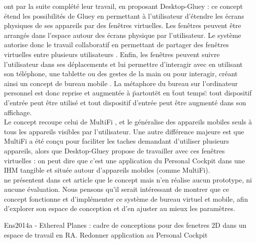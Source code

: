 
\cite{Serrano2015a} ont par la suite complété leur travail, en proposant Desktop-Gluey : ce concept étend les possibilités de Gluey en permettant à l'utilisateur d'étendre les écrans physiques de ses appareils par des fenêtres virtuelles. Les fenêtres peuvent être arrangés dans l'espace autour des écrans physique par l'utilisateur. Le système autorise donc le travail collaboratif en permettant de partager des fenêtres virtuelles entre plusieurs utilisateurs . Enfin, les fenêtres peuvent suivre l'utilisateur dans ses déplacements et lui permettre d'interagir avec en utilisant son téléphone, une tablette ou des gestes de la main ou pour interagir, créant ainsi un concept de bureau mobile . La métaphore du bureau sur l'ordinateur personnel est donc reprise et augmentée à \"partout\" et en \"tout temps\" : tout dispositif d'entrée peut être utilisé et tout dispositif d'entrée peut être augmenté dans son affichage.\\
Le concept recoupe celui de MultiFi \citep{Grubert2015}, et le généralise des appareils mobiles seuls à tous les appareils visibles par l'utilisateur. Une autre différence majeure est que MultiFi a été conçu pour faciliter les taches demandant d'utiliser plusieurs appareils, alors que Desktop-Gluey propose de travailler avec ces fenêtres virtuelles : on peut dire que c'est une application du Personal Cockpit \citep{EnsFinneganIrani2014} dans une IHM tangible et située autour d'appareils mobiles (comme MultiFi).\\
\citeauthor{Serrano2015a} ne présentent dans cet article que le concept mais n'en réalise aucun prototype, ni aucune évaluation. Nous pensons qu'il serait intéressant de montrer que ce concept fonctionne et d'implémenter ce système de bureau virtuel et mobile, afin d'explorer son espace de conception et d'en ajuster au mieux les paramètres.


Ens2014a - Ethereal Planes : cadre de conceptions pour des fenetres 2D dans un espace de travail en RA. Redonner application au Personal Cockpit

